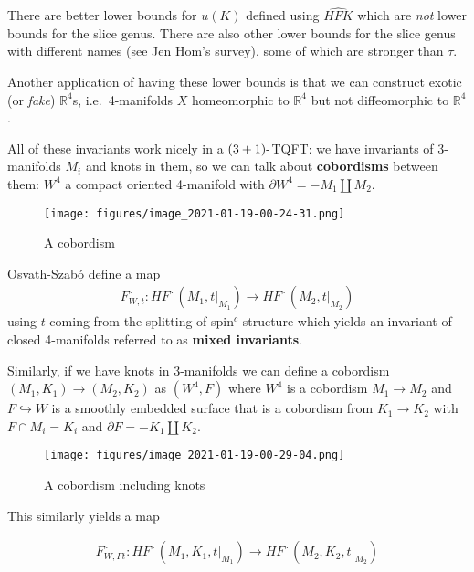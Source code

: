 \begin{remark}

There are better lower bounds for \(u(K)\) defined using
\(\widehat{HFK}\) which are \emph{not} lower bounds for the slice genus.
There are also other lower bounds for the slice genus with different
names (see Jen Hom's survey), some of which are stronger than \(\tau\).

\end{remark}

\begin{remark}

Another application of having these lower bounds is that we can
construct exotic (or \emph{fake}) \({\mathbb{R}}^4\)s, i.e.~4-manifolds
\(X\) homeomorphic to \({\mathbb{R}}^4\) but not diffeomorphic to
\({\mathbb{R}}^4\).

\end{remark}

\begin{remark}

All of these invariants work nicely in a \((3+1){\hbox{-}}\)TQFT: we
have invariants of 3-manifolds \(M_i\) and knots in them, so we can talk
about \textbf{cobordisms} between them: \(W^4\) a compact oriented
4-manifold with \({{\partial}}W^4 = -M_1 {\coprod}M_2\).

\begin{figure}
\centering
\texttt{[image: figures/image\_2021-01-19-00-24-31.png]}
\caption{A cobordism}
\end{figure}

Osvath-Szabó define a map
\begin{align*}
F_{W, t}^{\,\cdot\,}: HF^{\,\cdot\,}(M_1, { \left.{{t}} \right|_{{M_1}} } ) \to HF^{\,\cdot\,}(M_2, { \left.{{t}} \right|_{{M_2}} })
\end{align*}
using \(t\) coming from the splitting of spin\(^c\) structure which
yields an invariant of closed 4-manifolds referred to as \textbf{mixed
invariants}.

Similarly, if we have knots in 3-manifolds we can define a cobordism
\((M_1, K_1) \to (M_2, K_2)\) as \((W^4, F)\) where \(W^4\) is a
cobordism \(M_1\to M_2\) and \(F\hookrightarrow W\) is a smoothly
embedded surface that is a cobordism from \(K_1\to K_2\) with
\(F \cap M_i = K_i\) and \({{\partial}}F = -K_1 {\coprod}K_2\).

\begin{figure}
\centering
\texttt{[image: figures/image\_2021-01-19-00-29-04.png]}
\caption{A cobordism including knots}
\end{figure}

This similarly yields a map

\begin{align*}
F_{W, F t}^{\,\cdot\,}: HF^{\,\cdot\,}(M_1, K_1, { \left.{{t}} \right|_{{M_1}} } ) \to HF^{\,\cdot\,}(M_2, K_2, { \left.{{t}} \right|_{{M_2}} })
\end{align*}

\end{remark}

